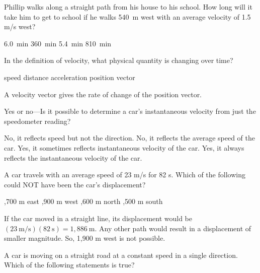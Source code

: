 \documentclass[]{exam}
\begin{document}
\begin{questions}
\question %
Phillip walks along a straight path from his house to his school. How long will it take him to get to school if he walks \SI{540}{m} west with an average velocity of 1.5 m/s west?

\begin{choices}
\CorrectChoice \SI{6.0}{min}
\choice \SI{360}{min}
\choice \SI{5.4}{min}
\choice \SI{810}{min}


\end{choices}

\question
In the definition of velocity, what physical quantity is changing over time?

\begin{choices}
\choice speed
\choice distance
\choice acceleration
\CorrectChoice position vector
\end{choices}

\begin{solution}
A velocity vector gives the rate of change of the position vector.
\end{solution}

\question
Yes or no---Is it possible to determine a car’s instantaneous velocity from just the speedometer reading?

\begin{choices}
\CorrectChoice No, it reflects speed but not the direction.
\choice No, it reflects the average speed of the car.
\choice Yes, it sometimes reflects instantaneous velocity of the car.
\choice Yes, it always reflects the instantaneous velocity of the car.
\end{choices}

\question
A car travels with an average speed of 23 m/s for 82 s. Which of the following could NOT have been the car's displacement?

\begin{choices}
,700 m east
,900 m west
,600 m north
,500 m south
\end{choices}

\begin{solution}
If the car moved in a straight line, its displacement would be $(23\ \mathrm{m/s})(82\ \mathrm{s}) = 1,886\ \mathrm{m}$. Any other path would result in a displacement of smaller magnitude. So, 1,900 m west is not possible.
\end{solution}

\question 
A car is moving on a straight road at a constant speed in a single direction. Which of the following statements is true?


\end{questions}
\end{document}
